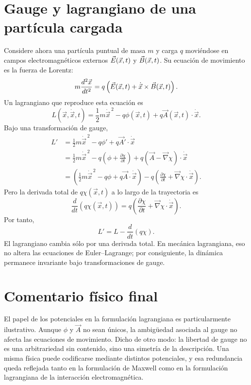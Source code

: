\documentclass[../main.tex]{subfiles}
\begin{document}
\section*{Gauge y lagrangiano de una partícula cargada}
Considere ahora una partícula puntual de masa $m$ y carga $q$ moviéndose en campos electromagnéticos externos $\vec{E}(\vec x,t)$ y $\vec{B}(\vec x,t)$. Su ecuación de movimiento es la fuerza de Lorentz:
\begin{equation*}
    m\frac{d^2\vec x}{dt^2} = q\left(\vec{E}(\vec x,t) + \dot{\vec x}\times\vec{B}(\vec x,t)\right).
\end{equation*}
Un lagrangiano que reproduce esta ecuación es
\begin{equation*}
    L(\vec x,\dot{\vec x},t)=\frac{1}{2}m\dot{\vec x}^{\,2}-q\phi(\vec x,t)+q\vec A(\vec x,t)\cdot\dot{\vec x}.
\end{equation*}
Bajo una transformación de gauge,
\begin{align*}
    L' &= \frac{1}{2}m\dot{\vec x}^{\,2} - q\phi' + q\vec A'\cdot\dot{\vec x} \\
    &= \frac{1}{2}m\dot{\vec x}^{\,2} - q\left(\phi + \frac{\partial \chi}{\partial t}\right) + q\left(\vec A - \vec\nabla\chi\right)\cdot\dot{\vec x} \\
    &= \left(\frac{1}{2}m\dot{\vec x}^{\,2}-q\phi+q\vec A\cdot\dot{\vec x}\right) - q\left(\frac{\partial \chi}{\partial t}+\vec\nabla\chi\cdot\dot{\vec x}\right).
\end{align*}
Pero la derivada total de $q\chi(\vec x,t)$ a lo largo de la trayectoria es
\begin{equation*}
    \frac{d}{dt}\left(q\chi(\vec x,t)\right)
    = q\left(\frac{\partial \chi}{\partial t}+\vec\nabla\chi\cdot\dot{\vec x}\right).
\end{equation*}
Por tanto,
\begin{equation*}
    L' = L - \frac{d}{dt}\left(q\chi\right).
\end{equation*}
El lagrangiano cambia sólo por una derivada total. En mecánica lagrangiana, eso no altera las ecuaciones de Euler--Lagrange; por consiguiente, la dinámica permanece invariante bajo transformaciones de gauge.

\section*{Comentario físico final}
El papel de los potenciales en la formulación lagrangiana es particularmente ilustrativo. Aunque $\phi$ y $\vec A$ no sean únicos, la ambigüedad asociada al gauge no afecta las ecuaciones de movimiento. Dicho de otro modo: la libertad de gauge no es una arbitrariedad sin contenido, sino una simetría de la descripción. Una misma física puede codificarse mediante distintos potenciales, y esa redundancia queda reflejada tanto en la formulación de Maxwell como en la formulación lagrangiana de la interacción electromagnética.
\end{document}
